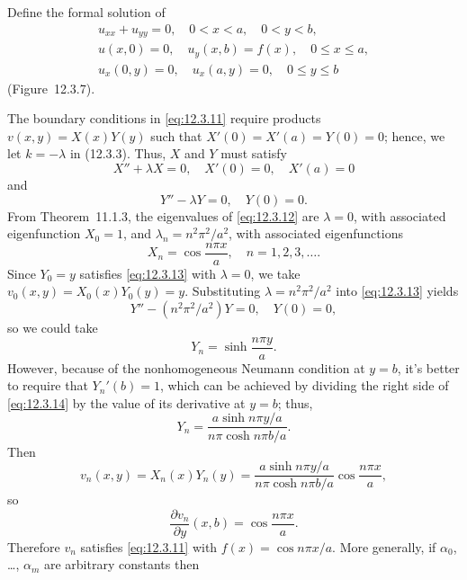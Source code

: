 \setcounter{example}{2}
\setcounter{equation}{10}
\begin{example}
  \label{example:12.3.3} \rm Define the formal solution of
  \begin{equation}
    \label{eq:12.3.11}
    \begin{array}{c}
      u_{xx}+u_{yy}=0,\quad0<x<a,\quad0<y<b,           \\
      u(x,0)=0,\quad u_{y}(x,b)=f(x),\quad0\le x\le a, \\
      u_{x}(0,y)=0,\quad u_{x}(a,y)=0,\quad0\le y\le b
    \end{array}
  \end{equation}
  (Figure~12.3.7).
\end{example}
\setcounter{equation}{11}
\begin{examplesolution}
\solution The boundary conditions in \eqref{eq:12.3.11} require products $v(x,y)=X(x)Y(y)$ such that
$X'(0)=X'(a)=Y(0)=0$; hence, we let $k=-\lambda$ in \textup{(12.3.3)}. Thus, $X$ and $Y$ must
satisfy
\begin{equation}
  \label{eq:12.3.12}X''+\lambda X=0,\quad X'(0)=0,\quad X'(a)=0
\end{equation}
and
\begin{equation}
  \label{eq:12.3.13}Y''-\lambda Y=0,\quad Y(0)=0.
\end{equation}
From Theorem~11.1.3, the eigenvalues of \eqref{eq:12.3.12} are $\lambda=0$, with
associated eigenfunction $X_{0}=1$, and $\lambda_{n}=n^{2}\pi^{2}/a^{2}$, with associated
eigenfunctions
\[
  X_{n}=\cos\frac{n\pi x}{a},\quad n=1,2,3,\dots.
\]
Since $Y_{0}=y$ satisfies \eqref{eq:12.3.13} with $\lambda=0$, we take
$v_{0}(x,y)=X_{0}(x)Y_{0}(y)=y$. Substituting $\lambda=n^{2}\pi^{2}/a^{2}$ into \eqref{eq:12.3.13}
yields
\[
  Y''-(n^{2}\pi^{2}/a^{2})Y=0,\quad Y(0)=0,
\]
so we could take
\begin{equation}
  \label{eq:12.3.14}Y_{n}=\sinh\frac{n\pi y}{a}.
\end{equation}
However, because of the nonhomogeneous Neumann condition at $y=b$, it's better to require that
$Y_{n}'(b)=1$, which can be achieved by dividing the right side of \eqref{eq:12.3.14} by the value
of its derivative at $y=b$; thus,
\[
  Y_{n}=\frac{a\sinh n\pi y/a}{n\pi\cosh n\pi b/a}.
\]
Then
\[
  v_{n}(x,y)=X_{n}(x)Y_{n}(y)= \frac{a\sinh n\pi y/a}{n\pi\cosh n\pi b/a}\cos\frac{n\pi x}{a},
\]
so
\[
  \frac{\partial v_{n}}{\partial y}(x,b)=\cos\frac{n\pi x}{a}.
\]
Therefore $v_{n}$ satisfies \eqref{eq:12.3.11} with $f(x)=\cos n\pi x/a$. More generally, if
$\alpha_{0}$, \dots, $\alpha_{m}$ are arbitrary constants then

\end{examplesolution}
